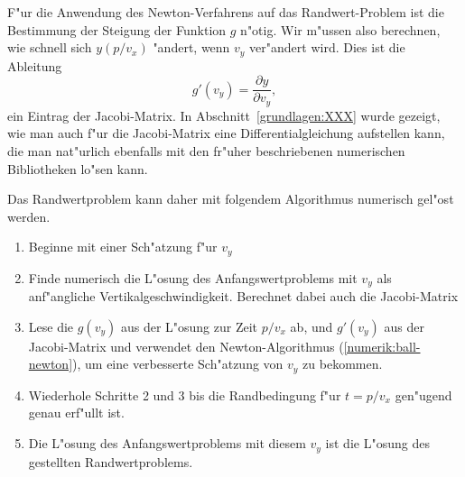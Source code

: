 F"ur die Anwendung des Newton-Verfahrens auf das Randwert-Problem
ist die Bestimmung der Steigung der Funktion $g$ n"otig.
Wir m"ussen also berechnen, wie schnell sich $y(p/v_x)$ "andert,
wenn $v_y$ ver"andert wird.
Dies ist die Ableitung
\[
g'(v_y)= \frac{\partial y}{\partial v_y},
\]
ein Eintrag der Jacobi-Matrix.
In Abschnitt~\ref{grundlagen:XXX} wurde gezeigt, wie man auch f"ur
die Jacobi-Matrix eine Differentialgleichung aufstellen kann, die
man nat"urlich ebenfalls mit den fr"uher beschriebenen numerischen
Bibliotheken lo"sen kann.

Das Randwertproblem kann daher mit folgendem Algorithmus numerisch gel"ost
werden.
\begin{enumerate}
\item Beginne mit einer Sch"atzung f"ur $v_y$
\item Finde numerisch die L"osung des Anfangswertproblems mit $v_y$
als anf"angliche Vertikalgeschwindigkeit.
Berechnet dabei auch die Jacobi-Matrix
\item Lese die $g(v_y)$ aus der L"osung zur Zeit $p/v_x$ ab, und $g'(v_y)$
aus der Jacobi-Matrix und verwendet den Newton-Algorithmus
(\ref{numerik:ball-newton}), um eine verbesserte Sch"atzung von $v_y$ 
zu bekommen.
\item Wiederhole Schritte 2 und 3 bis die Randbedingung f"ur $t=p/v_x$
gen"ugend genau erf"ullt ist.
\item Die L"osung des Anfangswertproblems mit diesem $v_y$ ist die
L"osung des gestellten Randwertproblems.
\end{enumerate}

